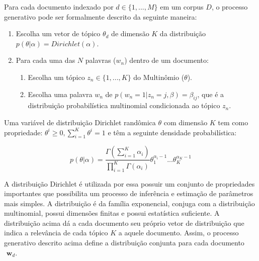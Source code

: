 \documentclass[12pt,a4paper]{article}
\begin{document}
 Para cada documento indexado por $d \in \{1,. . . , M\}$ em um corpus $D$, o processo generativo pode ser formalmente descrito da seguinte maneira:


\begin{enumerate}
  \item Escolha um vetor de tópico $\theta _d$ de dimensão $K$ da distribuição $p(\theta|\alpha)=Dirichlet(\alpha)$.
  \item Para cada uma das $N$ palavras ($w_n$) dentro de um documento:
  \begin{enumerate}
  	\item Escolha um tópico \(z_n \in \{1,. . . , K\}\) do Multinômio ($\theta$).
    \item Escolha uma palavra $w_n$ de \(p(w_n=1| z_n=j,\beta)=\beta _{ij}\), que é a distribuição probabilística multinomial condicionada ao tópico $z_n$.
  \end{enumerate}
\end{enumerate}


Uma variável de distribuição Dirichlet randômica $\theta$ com dimensão $K$ tem como propriedade: $\theta ^i \geq 0, \displaystyle\sum_{i=1}^{K} \theta ^i = 1$ e têm a seguinte densidade probabilística:

\begin{equation}
p(\theta|\alpha) = \frac{\Gamma(\displaystyle\sum_{i=1}^{K} \alpha _i)}{\displaystyle\prod_{i=1}^{K} \Gamma(\alpha _i)} \theta _1 ^{\alpha _i - 1} ...  \theta _K ^{\alpha _K - 1}
\end{equation}

A distribuição Dirichlet é utilizada por essa possuir um conjunto de propriedades importantes que possibilita um processo de inferência e estimação de parâmetros mais simples.
 A distribuição é da família exponencial, conjuga com a distribuição multinomial, possui dimensões finitas e possui estatística suficiente.
 A distribuição  acima dá a cada documento seu próprio vetor de distribuição que indica a relevância de cada tópico $K$ a aquele documento.
 Assim, o processo generativo descrito acima define a distribuição conjunta para cada documento $\textbf{ w}_d$.
\end{document}
